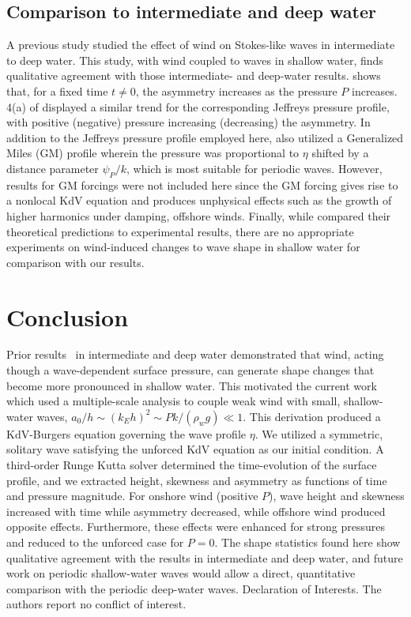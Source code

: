 \documentclass{jfm}
\begin{document}
\subsection{Comparison to intermediate and deep water}
A previous study \citep{zdyrski2020wind} studied the effect of
wind on Stokes-like waves in intermediate to deep water.
This study, with wind coupled to waves in shallow water, finds
qualitative agreement with those intermediate- and deep-water results.
 shows that, for a fixed time $t \neq 0$,
the asymmetry increases as the pressure $P$ increases.
\Figname{} 4(a) of \citet{zdyrski2020wind} displayed a similar trend for
the corresponding Jeffreys pressure profile, with positive (negative)
pressure increasing (decreasing) the asymmetry.
In addition to the Jeffreys pressure profile employed here,
\citet{zdyrski2020wind} also utilized a Generalized Miles (GM) profile
wherein the pressure was proportional to $\eta$ shifted by a distance
parameter $\psi_P/k$, which is most suitable for periodic waves.
However, results for GM forcings were not included here since the GM
forcing gives rise to a nonlocal KdV equation and produces unphysical
effects such as the growth of higher harmonics under damping, offshore
winds.
Finally, while \citet{zdyrski2020wind} compared their theoretical
predictions to experimental results, there are no appropriate
experiments on wind-induced changes to wave shape in shallow water for
comparison with our results.

\section{Conclusion}
Prior results~\citep{zdyrski2020wind} in intermediate and deep water
demonstrated that wind, acting though a wave-dependent surface
pressure, can generate shape changes that become more pronounced in
shallow water.
This motivated the current work which used a multiple-scale analysis to
couple weak wind with small, shallow-water waves, \ie{} $a_0/h \sim (k_E
h)^2 \sim P k/(\rho_w g) \ll 1$.
This derivation produced a KdV-Burgers equation governing the wave
profile $\eta$.
We utilized a symmetric, solitary wave satisfying the unforced KdV
equation as our initial condition.
A third-order Runge Kutta solver determined the time-evolution of the
surface profile, and we extracted height, skewness and asymmetry as
functions of time and pressure magnitude.
For onshore wind (positive $P$), wave height and skewness increased with
time while asymmetry decreased, while offshore wind produced opposite
effects.
Furthermore, these effects were enhanced for strong pressures and
reduced to the unforced case for $P=0$.
The shape statistics found here show qualitative agreement with the
results in intermediate and deep water, and future work on periodic
shallow-water waves would allow a direct, quantitative comparison with
the periodic deep-water waves.
Declaration of Interests. The authors report no conflict of interest.

\appendix



\end{document}
